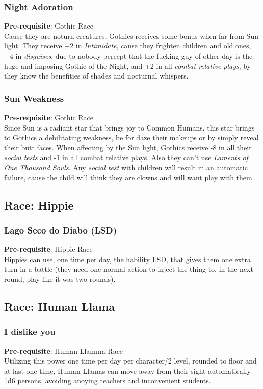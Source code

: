 \documentclass[ letterpaper,12pt]{article}
\begin{document}
\subsubsection{Night Adoration}
{\bf Pre-requisite}: Gothic Race\\
Cause they are noturn creatures, Gothics receives some bonus when far from Sun light.  They receive +2 in {\it Intimidate}, cause they frighten children and old ones, +4 in {\it disguises}, due to nobody percept that the fucking guy of other day is the huge and imposing Gothic of the Night, and +2 in all {\it combat relative plays}, by they know the benefities of shades and nocturnal whispers.\\

\subsubsection{Sun Weakness}
 {\bf Pre-requisite}: Gothic Race\\
 Since Sun is a radiant star that brings joy to Common Humans, this star brings to Gothics a debilitating weakness, be for daze their makeups or by simply reveal their butt faces. When affecting by the Sun light, Gothics receive -8 in all their {\it social tests} and -1 in all {combat relative plays}. Also they can't use {\it Laments of One Thousand Souls}. Any {\it social test} with children will result in an automatic failure, cause the child will think they are clowns and will want play with them.

\subsection{Race: Hippie}

\subsubsection{Lago Seco do Diabo (LSD)}
{\bf Pre-requisite}: Hippie Race\\
Hippies can use, one time per day, the hability LSD, that gives them one extra turn in a battle (they need one normal action to inject the thing to, in the next round, play like it was two rounds).

\subsection{Race: Human Llama}

\subsubsection{I dislike you}
 {\bf Pre-requisite}: Human Llamma Race\\
Utilizing this power one time per day per character/2 level, rounded to floor and at last one time, Human Llamas can move away from their sight automatically 1d6 persons, avoiding anoying teachers and inconvenient students.
\end{document}
